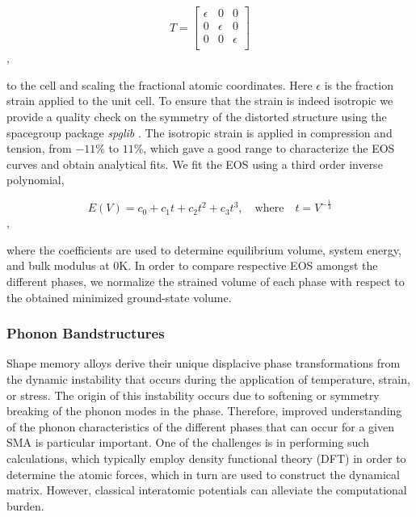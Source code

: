 \documentclass[preprint,colorlinks=true,linkcolor=black,citecolor=black]{elsarticle}
\begin{document}
\begin{equation}
  \label{eq:isotropic_strain}
  T=\begin{bmatrix}
    \epsilon & 0 & 0 \\
    0 & \epsilon & 0 \\
    0 & 0 & \epsilon \\
  \end{bmatrix}
\end{equation},

to the cell and scaling the fractional atomic coordinates. Here $\epsilon$ is the fraction strain applied to the unit cell. To ensure that the strain is indeed isotropic we provide a quality check on the symmetry of the distorted structure using the spacegroup package \textit{spglib} \cite{Togo2018}. The isotropic strain is applied in compression and tension, from $-11\%$ to $11\%$, which gave a good range to characterize the EOS curves and obtain analytical fits. We fit the EOS using a third order inverse polynomial,

\begin{equation}
  \label{eq:eos_fit}
  E(V) = c_0 + c_1 t + c_2 t^2 + c_3 t^3, \quad \text{where} \quad t = V^{-\frac{1}{3}}
\end{equation},

where the coefficients are used to determine equilibrium volume, system energy, and bulk modulus \cite{Alchagirov2003} at 0K. In order to compare respective EOS amongst the different phases, we normalize the strained volume of each phase with respect to the obtained minimized ground-state volume. \par

\subsubsection{Phonon Bandstructures}

Shape memory alloys derive their unique displacive phase transformations from the dynamic instability that occurs during the application of temperature, strain, or stress. The origin of this instability occurs due to softening or symmetry breaking of the phonon modes in the phase. Therefore, improved understanding of the phonon characteristics of the different phases that can occur for a given SMA is particular important. One of the challenges is in performing such calculations, which typically employ density functional theory (DFT) in order to determine the atomic forces, which in turn are used to construct the dynamical matrix. However, classical interatomic potentials can alleviate the computational burden. \par
\end{document}
